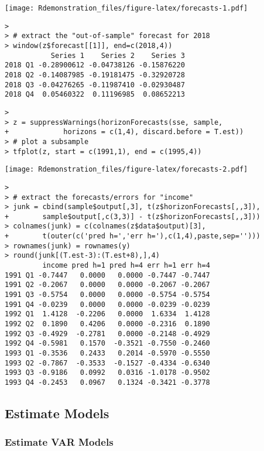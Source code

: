 \documentclass[]{article}
\begin{document}
\texttt{[image: Rdemonstration\_files/figure-latex/forecasts-1.pdf]}

\begin{verbatim}
> 
> # extract the "out-of-sample" forecast for 2018
> window(z$forecast[[1]], end=c(2018,4))
           Series 1    Series 2    Series 3
2018 Q1 -0.28900612 -0.04738126 -0.15876220
2018 Q2 -0.14087985 -0.19181475 -0.32920728
2018 Q3 -0.04276265 -0.11987410 -0.02930487
2018 Q4  0.05460322  0.11196985  0.08652213
\end{verbatim}

\begin{verbatim}
> 
> z = suppressWarnings(horizonForecasts(sse, sample, 
+             horizons = c(1,4), discard.before = T.est))
> # plot a subsample
> tfplot(z, start = c(1991,1), end = c(1995,4)) 
\end{verbatim}

\texttt{[image: Rdemonstration\_files/figure-latex/forecasts-2.pdf]}

\begin{verbatim}
> 
> # extract the forecasts/errors for "income"
> junk = cbind(sample$output[,3], t(z$horizonForecasts[,,3]), 
+        sample$output[,c(3,3)] - t(z$horizonForecasts[,,3]))
> colnames(junk) = c(colnames(z$data$output)[3], 
+        t(outer(c('pred h=','err h='),c(1,4),paste,sep='')))
> rownames(junk) = rownames(y)
> round(junk[(T.est-3):(T.est+8),],4)
         income pred h=1 pred h=4 err h=1 err h=4
1991 Q1 -0.7447   0.0000   0.0000 -0.7447 -0.7447
1991 Q2 -0.2067   0.0000   0.0000 -0.2067 -0.2067
1991 Q3 -0.5754   0.0000   0.0000 -0.5754 -0.5754
1991 Q4 -0.0239   0.0000   0.0000 -0.0239 -0.0239
1992 Q1  1.4128  -0.2206   0.0000  1.6334  1.4128
1992 Q2  0.1890   0.4206   0.0000 -0.2316  0.1890
1992 Q3 -0.4929  -0.2781   0.0000 -0.2148 -0.4929
1992 Q4 -0.5981   0.1570  -0.3521 -0.7550 -0.2460
1993 Q1 -0.3536   0.2433   0.2014 -0.5970 -0.5550
1993 Q2 -0.7867  -0.3533  -0.1527 -0.4334 -0.6340
1993 Q3 -0.9186   0.0992   0.0316 -1.0178 -0.9502
1993 Q4 -0.2453   0.0967   0.1324 -0.3421 -0.3778
\end{verbatim}

\subsection{Estimate Models}\label{estimate-models}

\subsubsection{Estimate VAR Models}\label{estimate-var-models}
\end{document}
